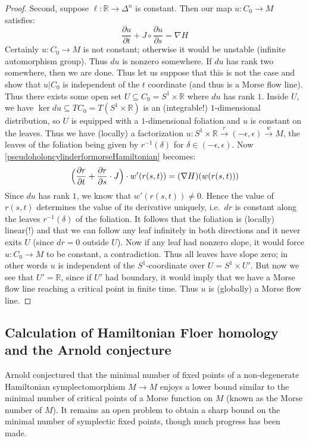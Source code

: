 \documentclass[12pt]{article}
\theoremstyle{definition}
\theoremstyle{remark}
\numberwithin{equation}{subsection}
\newcommand{\RR}{\mathbb R}
\begin{document}
\begin{proof}
Second, suppose $\ell:\RR\to\Delta^n$ is constant.  Then our map $u:C_0\to M$ satisfies:
\begin{equation}\label{pseudoholoncylinderformorseHamiltonian}
\frac{\partial u}{\partial t}+J\circ\frac{\partial u}{\partial s}=\nabla H
\end{equation}
Certainly $u:C_0\to M$ is not constant; otherwise it would be unstable (infinite automorphism group).  Thus $du$ is nonzero somewhere.  If $du$ has rank two somewhere, then we are done.  Thus let us suppose that this is not the case and show that $u|C_0$ is independent of the $t$ coordinate (and thus is a Morse flow line).  Thus there exists some open set $U\subseteq C_0=S^1\times\RR$ where $du$ has rank $1$.  Inside $U$, we have $\ker du\subseteq TC_0=T(S^1\times\RR)$ is an (integrable!) $1$-dimensional distribution, so $U$ is equipped with a $1$-dimensional foliation and $u$ is constant on the leaves.  Thus we have (locally) a factorization $u:S^1\times\RR\xrightarrow r(-\epsilon,\epsilon)\xrightarrow wM$, the leaves of the foliation being given by $r^{-1}(\delta)$ for $\delta\in(-\epsilon,\epsilon)$.  Now \eqref{pseudoholoncylinderformorseHamiltonian} becomes:
\begin{equation}
\Bigl(\frac{\partial r}{\partial t}+\frac{\partial r}{\partial s}\cdot J\Bigr)\cdot w'(r(s,t))=(\nabla H)(w(r(s,t)))
\end{equation}
Since $du$ has rank $1$, we know that $w'(r(s,t))\ne 0$.  Hence the value of $r(s,t)$ determines the value of its derivative uniquely, i.e.\ $dr$ is constant along the leaves $r^{-1}(\delta)$ of the foliation.  It follows that the foliation is (locally) linear(!) and that we can follow any leaf infinitely in both directions and it never exits $U$ (since $dr=0$ outside $U$).  Now if any leaf had nonzero slope, it would force $u:C_0\to M$ to be constant, a contradiction.  Thus all leaves have slope zero; in other words $u$ is independent of the $S^1$-coordinate over $U=S^1\times U'$.  But now we see that $U'=\RR$, since if $U'$ had boundary, it would imply that we have a Morse flow line reaching a critical point in finite time.  Thus $u$ is (globally) a Morse flow line.
\end{proof}

\subsection{Calculation of Hamiltonian Floer homology and the Arnold conjecture}

Arnold conjectured that the minimal number of fixed points of a non-degenerate Hamiltonian symplectomorphism $M\to M$ enjoys a lower bound similar to the minimal number of critical points of a Morse function on $M$ (known as the Morse number of $M$).  It remains an open problem to obtain a sharp bound on the minimal number of symplectic fixed points, though much progress has been made.
\end{document}
